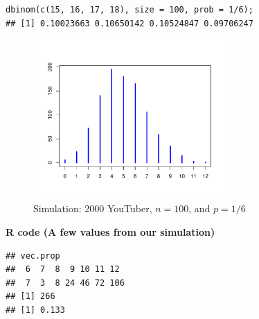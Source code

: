 \begin{tcolorbox}[colback=gray!10, colframe=black!45, arc=2mm]
\begin{verbatim}
dbinom(c(15, 16, 17, 18), size = 100, prob = 1/6);
## [1] 0.10023663 0.10650142 0.10524847 0.09706247
\end{verbatim}
\end{tcolorbox}
\vspace{1em}
\begin{figure}[H]
  \centering
  \includegraphics[width=0.65\textwidth]{section11/images/binomial_simulation_histogram.pdf}
  \caption{Simulation: 2000 YouTuber, $n = 100$, and $p = 1/6$}
\end{figure}
\vspace{1em}
\noindent\textbf{R code (A few values from our simulation)}

\begin{tcolorbox}[colback=gray!10, colframe=black!45, arc=2mm]
\begin{verbatim}
## vec.prop
##  6  7  8  9 10 11 12 
##  7  3  8 24 46 72 106 
## [1] 266
## [1] 0.133
\end{verbatim}
\end{tcolorbox}
\vspace{1em}

